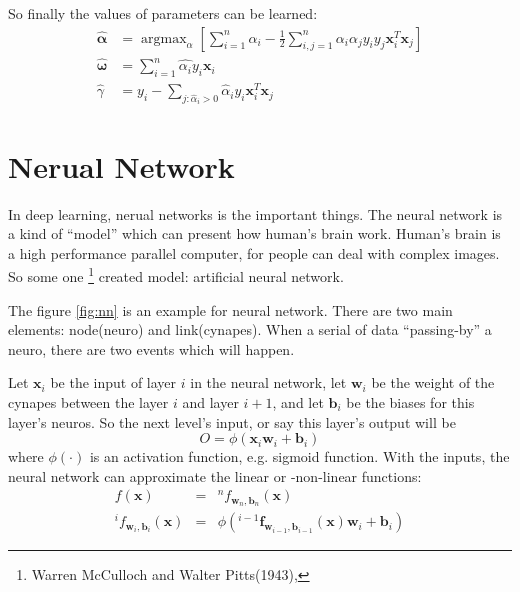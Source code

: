 \documentclass{article}
\begin{document}
So finally the values of parameters can be learned:
\begin{align}
\hat{\mathbf{\alpha}} &= \mathop{argmax}_\alpha\left[\sum\limits_{i=1}^{n}\alpha_i-\frac{1}{2}\sum\limits_{i,j=1}^{n}\alpha_i\alpha_jy_iy_j\mathbf{x}^T_i\mathbf{x}_j \right]
\\
\hat{\mathbf{\omega}} &= \sum\limits_{i=1}^{n}\hat{\alpha_i}y_i\mathbf{x}_i
\\
\hat{\gamma} &= y_i - \sum\limits_{j:\hat{\alpha}_i>0}\hat{\alpha}_iy_i\mathbf{x}_i^T\mathbf{x}_j
\end{align}


\section{Nerual Network}
\label{sec:nn}

In deep learning, nerual networks is the important things.
The neural network is a kind of ``model'' which can present how human's brain work.
Human's brain is a high performance parallel computer, for people can deal with complex images\cite{NNnML1}.
So some one%
\footnote{Warren McCulloch and Walter Pitts(1943),\cite{McCulloch194}}
created model: artificial neural network.

The figure \ref{fig:nn} is an example for neural network.
There are two main elements: node(neuro) and link(cynapes).
When a serial of data ``passing-by'' a neuro, there are two events which will happen.

Let $\mathbf{x}_i$ be the input of layer $i$ in the neural network, let $\mathbf{w}_i$
be the weight of the cynapes between the layer $i$ and layer $i+1$,
and let $\mathbf{b}_i$ be the biases for this layer's neuros.
So the next level's input, or say this layer's output will be
$$
  O = \phi\left(\mathbf{x}_i\mathbf{w}_i + \mathbf{b}_i\right)
$$
where $\phi(\cdot)$ is an activation function, e.g. sigmoid function.
With the inputs, the neural network can approximate the linear or -non-linear functions:
\begin{equation}
  \label{eq:nn:app}
  \begin{array}{rcl}
  f(\mathbf{x}) &=& ^nf_{\mathbf{w}_n,\mathbf{b}_n}(\mathbf{x}) \\
  {}^if_{\mathbf{w}_i,\mathbf{b}_i}(\mathbf{x}) &=& \phi\left({}^{i-1}\mathbf{f}_{\mathbf{w}_{i-1},\mathbf{b}_{i-1}}(\mathbf{x})\mathbf{w}_i + \mathbf{b}_i\right)
  \end{array}
\end{equation}
\end{document}
